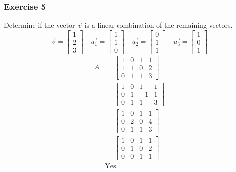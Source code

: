 \documentclass{math}
\begin{document}
\subsubsection*{Exercise 5}
Determine if the vector \( \vec{v} \) is a linear combination of the remaining
vectors.
\[ \vec{v} = \begin{bmatrix}1 \\ 2 \\ 3\end{bmatrix} \quad
  \vec{u_1} = \begin{bmatrix}1 \\ 1 \\ 0\end{bmatrix} \quad
  \vec{u_2} = \begin{bmatrix}0 \\ 1 \\ 1\end{bmatrix} \quad
  \vec{u_3} = \begin{bmatrix}1 \\ 0 \\ 1\end{bmatrix} \]
\begin{align*}
  A &= \begin{bmatrix}
    1 & 0 & 1 & 1 \\
    1 & 1 & 0 & 2 \\
    0 & 1 & 1 & 3
  \end{bmatrix} \\
  &= \begin{bmatrix}
    1 & 0 & 1 & 1 \\
    0 & 1 & -1 & 1 \\
    0 & 1 & 1 & 3
  \end{bmatrix} \\
  &= \begin{bmatrix}
    1 & 0 & 1 & 1 \\
    0 & 2 & 0 & 4 \\
    0 & 1 & 1 & 3
  \end{bmatrix} \\
  &= \begin{bmatrix}
    1 & 0 & 1 & 1 \\
    0 & 1 & 0 & 2 \\
    0 & 0 & 1 & 1
  \end{bmatrix} \\
  & \text{Yes}
\end{align*}
\end{document}
